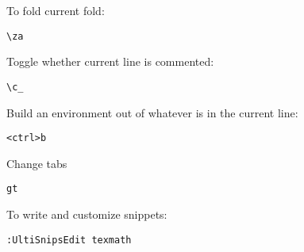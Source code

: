 \documentclass{amsart}
\begin{document}
To fold current fold:
\begin{verbatim}
\za
\end{verbatim}

Toggle whether current line is commented:
\begin{verbatim}
\c_
\end{verbatim}

Build an environment out of whatever is in the current line:
\begin{verbatim}
<ctrl>b
\end{verbatim}

Change tabs
\begin{verbatim}
gt
\end{verbatim}

To write and customize snippets:
\begin{verbatim}
:UltiSnipsEdit texmath
\end{verbatim}
\end{document}
